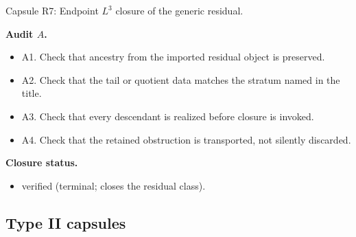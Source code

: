 \documentclass[11pt]{amsart}
\newcommand{\capsulefield}[1]{\par\smallskip\noindent\textbf{#1.}\ }
\begin{document}
\begin{proofcapsule}{Capsule R7: Endpoint $L^3$ closure of the generic residual.}
  \capsulefield{Audit \(A\)}
  \begin{itemize}[leftmargin=1.8em]
  \item A1. Check that ancestry from the imported residual object is preserved.
  \item A2. Check that the tail or quotient data matches the stratum named in the title.
  \item A3. Check that every descendant is realized before closure is invoked.
  \item A4. Check that the retained obstruction is transported, not silently discarded.
  \end{itemize}
  \capsulefield{Closure status}
  \begin{itemize}[leftmargin=1.8em]
  \item verified (terminal; closes the residual class).
  \end{itemize}
\end{proofcapsule}

\subsection{Type II capsules}
\end{document}
